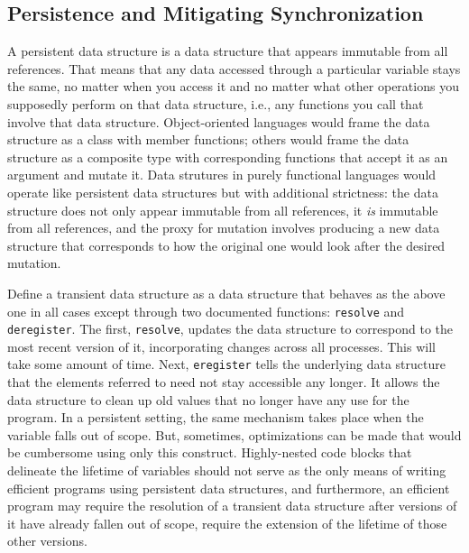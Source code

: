 \subsection{Persistence and Mitigating Synchronization}
A persistent data structure is a data structure that appears immutable from all
references. That means that any data accessed through a particular variable
stays the same, no matter when you access it and no matter what other
operations you supposedly perform on that data structure, i.e., any functions
you call that involve that data structure. Object-oriented languages would frame
the data structure as a class with member functions; others would frame the data
structure as a composite type with corresponding functions that accept it as
an argument and mutate it. Data strutures in purely functional languages would
operate like persistent data structures but with additional strictness: the data
structure does not only appear immutable from all references, it \textit{is}
immutable from all references, and the proxy for mutation involves producing a
new data structure that corresponds to how the original one would look after the
desired mutation.

Define a transient data structure as a data structure that behaves as the above
one in all cases except through two documented functions: \texttt{resolve} and
\texttt{deregister}. The first, \texttt{resolve}, updates the data structure to
correspond to the most recent version of it, incorporating changes across all
processes. This will take some amount of time. Next,
\texttt{eregister} tells the underlying data structure that the elements
referred to need not stay accessible any longer. It allows the data structure to
clean up old values that no longer have any use for the program. In a persistent
setting, the same mechanism takes place when the variable falls out of scope.
But, sometimes, optimizations can be made that would be cumbersome using only
this construct. Highly-nested code blocks that delineate the lifetime of
variables should not serve as the only means of writing efficient programs using
persistent data structures, and furthermore, an efficient program may require
the resolution of a transient data structure after versions of it have already
fallen out of scope, require the extension of the lifetime of those other
versions.

\newcommand{\tadd}{t_\mathrm{add}}
\newcommand{\tcomm}{t_\mathrm{comm}}
\newcommand{\tpar}{t_\mathrm{par}}
\newcommand{\tser}{t_\mathrm{ser}}

